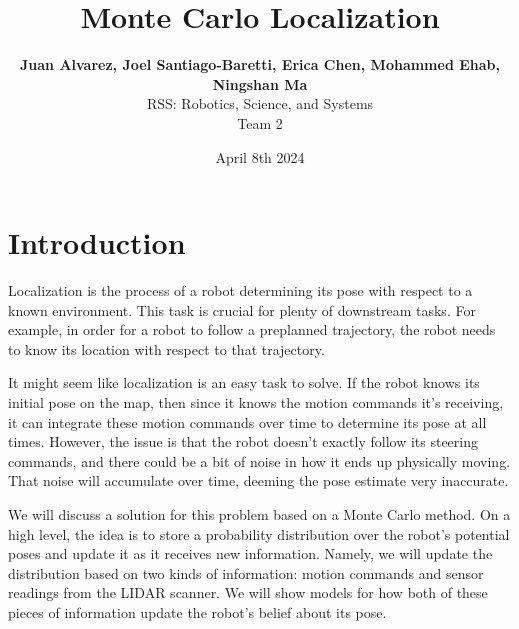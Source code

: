 \documentclass[11pt,twocolumn]{article}
\begin{document}
\title{\bf \Huge Monte Carlo Localization}
\author{{\bf Juan Alvarez, Joel Santiago-Baretti, Erica Chen, Mohammed Ehab, Ningshan Ma}\\
   RSS: Robotics, Science, and Systems \\ Team 2
  }
\date{April 8th 2024}


\let\leqslant=\leq

\label{firstpage}




\maketitle

\pagestyle{fancy}
\fancyhead[L]

\section{Introduction}

Localization is the process of a robot determining its pose with respect to a known environment. This task is crucial for plenty of downstream tasks. For example, in order for a robot to follow a preplanned trajectory, the robot needs to know its location with respect to that trajectory.

It might seem like localization is an easy task to solve. If the robot knows its initial pose on the map, then since it knows the motion commands it's receiving, it can integrate these motion commands over time to determine its pose at all times. However, the issue is that the robot doesn't exactly follow its steering commands, and there could be a bit of noise in how it ends up physically moving. That noise will accumulate over time, deeming the pose estimate very inaccurate.

We will discuss a solution for this problem based on a Monte Carlo method. On a high level, the idea is to store a probability distribution over the robot's potential poses and update it as it receives new information. Namely, we will update the distribution based on two kinds of information: motion commands and sensor readings from the LIDAR scanner. We will show models for how both of these pieces of information update the robot's belief about its pose.
\end{document}
